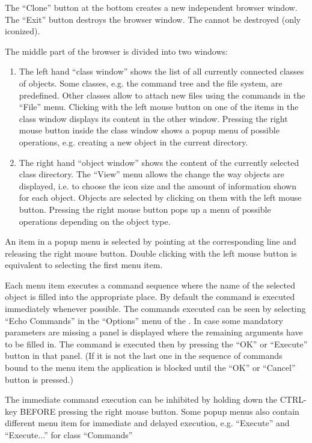 The ``Clone'' button at the bottom creates a new independent browser window.
The ``Exit'' button destroys the browser window. The \MB{} cannot be
destroyed (only iconized).

The middle part of the browser is divided into two windows:

\begin{enumerate}
\item The left hand ``class window'' shows the list of all currently connected
   classes of objects.  Some classes, e.g. the command tree and the file
   system, are predefined.  Other classes allow to attach new files using the
   commands in the ``File'' menu.  Clicking with the left mouse button on
   one of
   the items in the class window displays its content in the other window.
   Pressing the right mouse button inside the class window shows a popup menu
   of possible operations, e.g. creating a new object in the current
   directory.

\item The right hand ``object window'' shows the content of the currently
   selected class directory.  The ``View'' menu allows the change the way
   objects are displayed, i.e. to choose the icon size and the amount of
   information shown for each object.  Objects are selected by clicking on
   them with the left mouse button.  Pressing the right mouse button pops up a
   menu of possible operations depending on the object type.
\end{enumerate}

   An item in a popup menu is selected by pointing at the corresponding line
   and releasing the right mouse button.  Double clicking with the left mouse
   button is equivalent to selecting the first menu item.

   Each menu item executes a command sequence where the name of the selected
   object is filled into the appropriate place.  By default the command is
   executed immediately whenever possible. The commands executed can be seen
   by selecting ``Echo Commands'' in the ``Options'' menu of the \EW.
   In case some mandatory parameters are missing a panel is displayed
   where the remaining arguments have to be filled in.  The command is
   executed then by pressing the ``OK'' or ``Execute'' button in that panel.
   (If it is not the last one in the sequence of commands bound to the menu item
   the application is blocked until the ``OK'' or ``Cancel'' button is pressed.)

   The immediate command execution can be inhibited by holding down the
   CTRL-key BEFORE pressing the right mouse button.  Some popup menus also
   contain different menu item for immediate and delayed execution, e.g.
   ``Execute'' and ``Execute...'' for class ``Commands''

